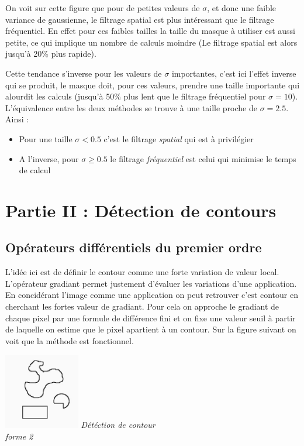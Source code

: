 \documentclass[a4,12pt]{article}
\begin{document}
On voit sur cette figure que pour de petites valeurs de $\sigma$, et donc une faible variance de gaussienne, le filtrage spatial est plus intéressant que le filtrage fréquentiel. En effet pour ces faibles tailles la taille du masque à utiliser est aussi petite, ce qui implique un nombre de calculs moindre (Le filtrage spatial est alors jusqu'à 20\% plus rapide).

Cette tendance s'inverse pour les valeurs de $\sigma$ importantes, c'est ici l'effet inverse qui se produit, le masque doit, pour ces valeurs, prendre une taille importante qui alourdit les calculs (jusqu'à 50\% plus lent que le filtrage fréquentiel pour $\sigma=10$).\\

\noindent
L'équivalence entre les deux méthodes se trouve à une taille proche de $\sigma = 2.5$. Ainsi :
\begin{itemize}
	\item Pour une taille $\sigma < 0.5$ c'est le filtrage \textit{spatial} qui est à privilégier
	\item A l'inverse, pour $\sigma \geq 0.5$ le filtrage \textit{fréquentiel} est celui qui minimise le temps de calcul
\end{itemize}


\section{Partie II : Détection de contours}

\subsection{Opérateurs différentiels du premier ordre}
L'idée ici est de définir le contour comme une forte variation de valeur local. L'opérateur gradiant permet justement d'évaluer les variations d'une application.
En concidérant l'image comme une application on peut retrouver c'est contour en cherchant les fortes valeur de gradiant.
Pour cela on approche le gradiant de chaque pixel par une formule de différence fini et on fixe une valeur seuil à partir de laquelle on estime que le pixel apartient à un contour.
Sur la figure suivant on voit que la méthode est fonctionnel.\\

\noindent
\begin{center}
\begin{minipage}[c]{0.20\linewidth}
	\begin{center}
		\includegraphics[width = 33mm]{./img/p2test_grad_mean_formes2.jpg}
		\textit{Détéction de contour\\ forme 2}
	\end{center}
\end{minipage}
\end{center}
\end{document}
